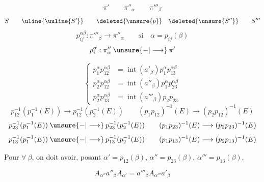 \[
\pi'\qquad \pi''_\alpha\qquad \pi'''_\beta
\]
\[
S\qquad \uline{\uuline{S'}}\qquad
\deleted{\unsure{p}}\quad \deleted{\unsure{S''}}\qquad S'''
\]
\[
p_{ij}^{\alpha\beta}:\pi'''_\beta\longrightarrow\pi''_\alpha
\qquad\text{si}\quad\alpha=p_{ij}(\beta)
\]
\[
p_i^\alpha:\pi''_\alpha\mathbin{\unsure{-|\longrightarrow}}\pi'
\]

\[
\left\{\begin{aligned}
p_1^\alpha p_{12}^{\alpha\beta}
 &=\operatorname{int}(a'_\beta)p_1^\alpha p_{13}^{\alpha\beta}\\
p_2^\alpha p_{12}^{\alpha\beta}
 &=\operatorname{int}(a''_\beta)p_1^\alpha p_{23}^{\alpha\beta}\\
p_2^\alpha p_{13}^{\alpha\beta}
 &=\operatorname{int}(a'''_\beta)p_2p_{23}
\end{aligned}\right.
\]
\[
p_{12}^{-1}(p_1^{-1}(E))\longrightarrow p_{12}^{-1}(p_2^{-1}(E))
\qquad
(p_1p_{12})^{-1}(E)\longrightarrow(p_2p_{12})^{-1}(E)
\]
\[
p_{23}^{-1}(p_1^{-1}(E))\mathbin{\unsure{-|\longrightarrow}}
p_{23}^{-1}(p_2^{-1}(E))
\qquad
(p_1p_{23})^{-1}(E)\longrightarrow(p_2p_{23})^{-1}(E)
\]
\[
p_{13}^{-1}(p_1^{-1}(E))\mathbin{\unsure{-|\longrightarrow}}
p_{13}^{-1}(p_2^{-1}(E))
\qquad
(p_1p_{13})^{-1}(E)\longrightarrow(p_2p_{13})^{-1}(E)
\]


Pour $\forall\ \beta$, on doit avoir,
posant $\alpha'=p_{12}(\beta)$, $\alpha''=p_{23}(\beta)$,
$\alpha'''=p_{13}(\beta)$, 

\[
\boxed{A_{\alpha''}a''_\beta A_{\alpha'}=a'''_\beta A_{\alpha'''}a'_\beta}
\]

